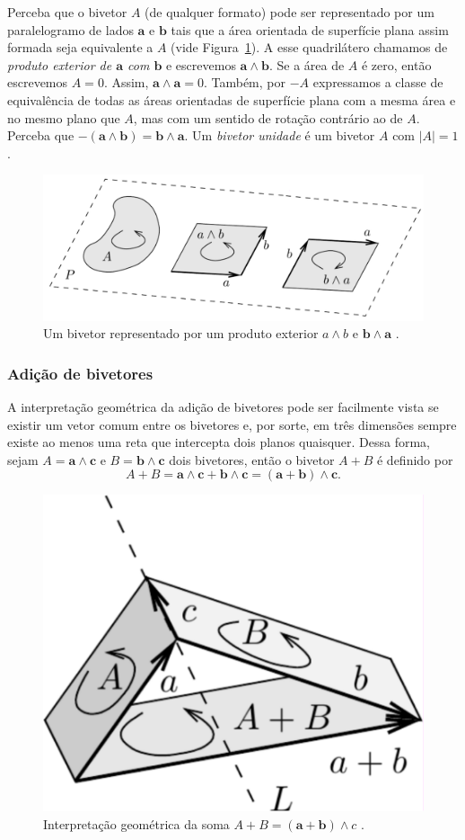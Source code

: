 \documentclass[a4paper,12pt]{report}
\theoremstyle{plain}
\theoremstyle{definition}
\newcommand{\norm}[1]{\left| #1 \right|}
\begin{document}
	Perceba que o bivetor $A$ (de qualquer formato) pode ser representado por um paralelogramo de lados $\mathbf a$ e $\mathbf b$ tais que a área orientada de superfície plana assim formada seja equivalente a $A$ (vide Figura~\ref{fig:2bladePlano}). A esse quadrilátero chamamos de \textit{produto exterior de $\mathbf a$ com $\mathbf b$} e escrevemos $\mathbf a \wedge \mathbf b$. Se a área de $A$ é zero, então escrevemos $A = 0$. Assim, $\mathbf a \wedge \mathbf a = 0$. Também, por $-A$ expressamos a classe de equivalência de todas as áreas orientadas de superfície plana com a mesma área e no mesmo plano que $A$, mas com um sentido de rotação contrário ao de $A$. Perceba que $-(\mathbf a \wedge \mathbf b) = \mathbf b \wedge \mathbf a$. Um \textit{bivetor unidade} é um bivetor $A$ com $\norm{A} = 1$.
	
		\begin{figure}[H]
			\begin{center}
				\includegraphics[width=0.75\linewidth]{figures/2bladePlano.pdf}
			\end{center}
			\caption{Um bivetor representado por um produto exterior $a\wedge b$ e $\mathbf b \wedge \mathbf a$ \cite{lundholm2009clifford}.}
			\label{fig:2bladePlano}
		\end{figure}
	
	\subsubsection{Adição de bivetores}
	
	A interpretação geométrica da adição de bivetores pode ser facilmente vista se existir um vetor comum entre os bivetores e, por sorte, em três dimensões sempre existe ao menos uma reta que intercepta dois planos quaisquer. Dessa forma, sejam $A = \mathbf a \wedge \mathbf c$ e $B = \mathbf b \wedge \mathbf c$ dois bivetores, então o bivetor $A + B$ é definido por $$A+B = \mathbf a \wedge \mathbf c + \mathbf b \wedge \mathbf c = (\mathbf a+ \mathbf b) \wedge \mathbf c.$$ 
	
	\begin{figure}[H]
		\begin{center}
			\includegraphics[width=0.32\linewidth]{figures/2bladeSoma.pdf}
		\end{center}
		\caption{Interpretação geométrica da soma $A+B = (\mathbf a+\mathbf b)\wedge c$ \cite{lundholm2009clifford}.}
		\label{fig:2bladeSoma}
	\end{figure}
	
\end{document}

